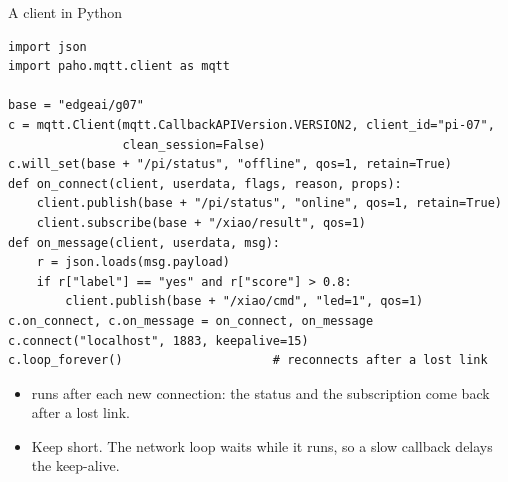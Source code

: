 \begin{frame}[fragile]{A client in Python}
\begin{lstlisting}[style=python]
import json
import paho.mqtt.client as mqtt

base = "edgeai/g07"
c = mqtt.Client(mqtt.CallbackAPIVersion.VERSION2, client_id="pi-07",
                clean_session=False)
c.will_set(base + "/pi/status", "offline", qos=1, retain=True)
def on_connect(client, userdata, flags, reason, props):
    client.publish(base + "/pi/status", "online", qos=1, retain=True)
    client.subscribe(base + "/xiao/result", qos=1)
def on_message(client, userdata, msg):
    r = json.loads(msg.payload)
    if r["label"] == "yes" and r["score"] > 0.8:
        client.publish(base + "/xiao/cmd", "led=1", qos=1)
c.on_connect, c.on_message = on_connect, on_message
c.connect("localhost", 1883, keepalive=15)
c.loop_forever()                     # reconnects after a lost link
\end{lstlisting}
  \small
  \begin{itemize}
    \item {} runs after each new connection: the status and
          the subscription come back after a lost link.
    \item Keep  short. The network loop waits while it
          runs, so a slow callback delays the keep-alive.
  \end{itemize}
\end{frame}


